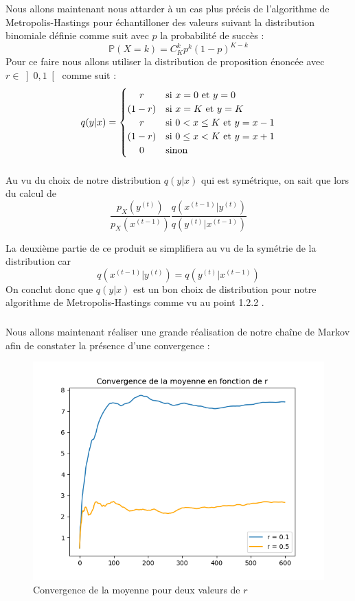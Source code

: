 Nous allons maintenant nous attarder à un cas plus précis de l'algorithme de Metropolis-Hastings pour échantilloner des valeurs suivant la 
distribution binomiale définie comme suit avec $p$ la probabilité de succès :
\begin{equation*}
  \mathbb{P}(X = k) = C_K^k p^k(1-p)^{K-k}
\end{equation*}
Pour ce faire nous allons utiliser la distribution de proposition énoncée avec \(r \in \left] 0, 1\right[\) comme suit :
\begin{equation*}
  q(y|x) = 
  \begin{cases}
    \hfil r & \text{si } x = 0 \text{ et } y = 0\\
    \hfil (1-r) &  \text{si } x = K \text{ et } y = K\\
    \hfil r & \text{si } 0 < x \leq K \text{ et } y = x - 1\\
    \hfil (1-r) & \text{si } 0 \leq x < K \text{ et } y = x + 1\\
    \hfil 0 & \text{sinon}
  \end{cases}
\end{equation*}

\subsubsection{}
Au vu du choix de notre distribution $q(y|x)$ qui est symétrique, on sait que lors du calcul de 
\begin{equation*}
  \frac{p_X(y^{(t)})}{p_X(x^{(t-1)})} \frac{q(x^{(t-1)}|y^{(t)})}{q(y^{(t)}|x^{(t-1)})}
\end{equation*}

La deuxième partie de ce produit se simplifiera au vu de la symétrie de la distribution car
\begin{equation*}
  q(x^{(t-1)}|y^{(t)}) = q(y^{(t)}|x^{(t-1)})
\end{equation*}
On conclut donc que $q(y|x)$ est un bon choix de distribution pour notre algorithme de Metropolis-Hastings comme vu au point 1.2.2 .

\subsubsection{}
\label{section:1.3.2}
Nous allons maintenant réaliser une grande réalisation de notre chaîne de Markov afin de constater la présence d'une convergence :

\begin{figure}[H]
  \centering
  \includegraphics[width=.6\textwidth]{figs/convergence_mean.png}
  \caption{Convergence de la moyenne pour deux valeurs de $r$}
\end{figure}

